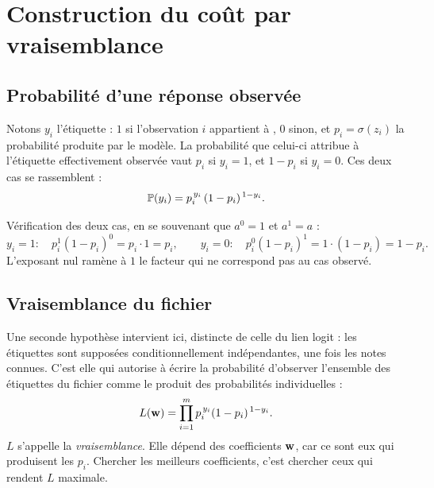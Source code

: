 \chapter{Construction du coût par vraisemblance}
\label{ann:cout}


\section{Probabilité d'une réponse observée}

Notons $y_i$ l'étiquette : $1$ si l'observation $i$ appartient à \Gryf, $0$ sinon, et
$p_i=\sigma(z_i)$ la probabilité produite par le modèle. La probabilité que celui-ci
attribue à l'étiquette effectivement observée vaut $p_i$ si $y_i=1$, et $1-p_i$
si $y_i=0$. Ces deux cas se rassemblent :
\[
  \mathbb{P}(y_i)=p_i^{\,y_i}\,(1-p_i)^{\,1-y_i}.
\]

Vérification des deux cas, en se souvenant que $a^{0}=1$ et $a^{1}=a$ :
\[
  y_i=1:\quad p_i^{1}(1-p_i)^{0}=p_i\cdot1=p_i,
  \qquad
  y_i=0:\quad p_i^{0}(1-p_i)^{1}=1\cdot(1-p_i)=1-p_i .
\]
L'exposant nul ramène à $1$ le facteur qui ne correspond pas au cas observé.

\section{Vraisemblance du fichier}

Une seconde hypothèse intervient ici, distincte de celle du lien logit : les
étiquettes sont supposées conditionnellement indépendantes, une fois les notes
connues. C'est elle qui autorise à écrire la probabilité d'observer l'ensemble
des étiquettes du fichier comme le produit des probabilités individuelles :
\[
  L(\mathbf{w})=\prod_{i=1}^{m}p_i^{\,y_i}(1-p_i)^{\,1-y_i}.
\]
$L$ s'appelle la \emph{vraisemblance}. Elle dépend des coefficients $\mathbf{w}$, car ce
sont eux qui produisent les $p_i$. Chercher les meilleurs coefficients, c'est
chercher ceux qui rendent $L$ maximale.

